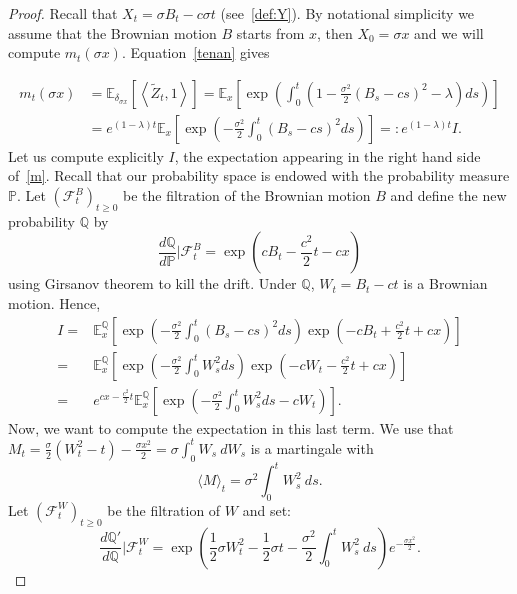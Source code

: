 \documentclass[AHL,Unicode,longabstracts,published]{cedram}
\newcommand{\Fo}{\mathcal{F}}
\renewcommand*\P{\mathbb{P}}
\newcommand*\E{\mathbb{E}}
\newcommand{\bbQ}{\mathbb{Q}}
\begin{document}
\begin{proof}
Recall that $X_{t}=\sigma B_{t}-c\sigma t$ (see~\eqref{def:Y}). By notational simplicity we assume that the Brownian motion $B$ starts from $x$, then $X_0=\sigma x$ and we will compute $m_{t}(\sigma x)$. Equation~\eqref{tenan} gives

\begin{equation}\label{m1}
\begin{split}
m_{t}(\sigma x)&=\E_{\delta_{\sigma x}}\left[\left\langle \widetilde{Z}_t, 1\right\rangle \right]=\E_{x}\left[\exp\left(\int_{0}^{t} \left(1-\frac{\sigma^2}{2}\left(B_{s}- c s\right)^2 -\lambda \right)ds \right)\right]\\
&=e^{(1-\lambda)t}\E_{x}\left[\exp\left(-\frac{\sigma^2}{2}\int_{0}^{t} \left(B_{s}-cs\right)^2 ds \right)\right]=: e^{(1-\lambda)t} I.
\end{split}
\end{equation}
Let us compute explicitly $I$, the expectation appearing in the right hand side of~\eqref{m}. Recall that our probability space is endowed with the probability measure $\P$. Let $(\Fo^B_{t})_{t \geq 0}$ be the filtration of the Brownian motion $B$ and define the new probability $\bbQ$ by
\[
\frac{d\bbQ}{d\P}\big|\Fo^B_{t}=\exp\left(cB_{t}-\frac{c^2}{2}t-cx\right)
\]
using Girsanov theorem to kill the drift. Under $\bbQ$, $W_{t}=B_{t}-ct$ is a Brownian motion. Hence,
\begin{equation}\label{etape1}
\begin{split}
I= & \E_{x}^{\bbQ}\left[\exp\left(-\frac{\sigma^2}{2}\int_{0}^{t} \left(B_{s}-cs\right)^2 ds \right)\exp\left(-cB_{t}+\frac{c^2}{2}t+cx\right)\right]\\
= & \E_{x}^{\bbQ}\left[\exp\left(-\frac{\sigma^2}{2}\int_{0}^{t} W_{s}^2 ds \right)\exp\left(-cW_{t}-\frac{c^2}{2}t+cx\right)\right]\\
= & e^{cx-\frac{c^2}{2}t}\E_{x}^{\bbQ}\left[\exp\left(-\frac{\sigma^2}{2}\int_{0}^{t} W_{s}^2 ds-cW_{t} \right)\right].
\end{split}
\end{equation}
Now, we want to compute the expectation in this last term. We use that $M_{t}=\tfrac{\sigma}{2}(W_{t}^2-t)-\tfrac{\sigma x^2}{2} = \sigma \int_{0}^t W_{s}\ dW_{s} $ is a martingale with
\[
\langle M\rangle_{t}=\sigma^2\int_{0}^{t}W_{s}^2\ ds.
\]
Let $(\Fo^W_{t})_{t \geq 0}$ be the filtration of $W$ and set:
\[
\frac{d\bbQ'}{d\bbQ}\Big|\Fo^W_{t}=\exp\left(\frac{1}{2}\sigma W_{t}^2-\frac{1}{2}\sigma t-\frac{\sigma^2}{2}\int_{0}^{t}W_{s}^{2}\ ds\right)e^{-\frac{\sigma x^2}{2}}.
\]
\end{proof}
\end{document}
